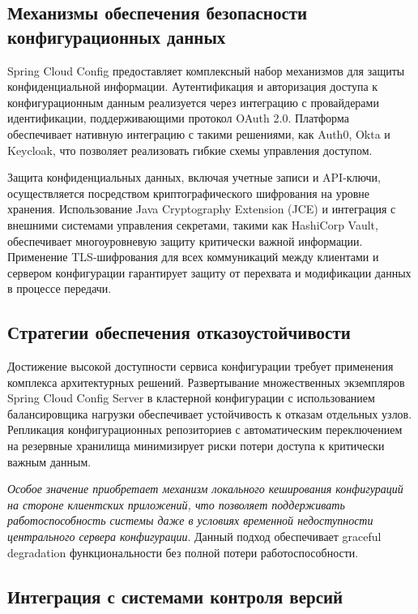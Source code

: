 \subsection{Механизмы обеспечения безопасности конфигурационных данных}

Spring Cloud Config предоставляет комплексный набор механизмов для защиты конфиденциальной информации. Аутентификация и авторизация доступа к конфигурационным данным реализуется через интеграцию с провайдерами идентификации, поддерживающими протокол OAuth 2.0. Платформа обеспечивает нативную интеграцию с такими решениями, как Auth0, Okta и Keycloak, что позволяет реализовать гибкие схемы управления доступом.

Защита конфиденциальных данных, включая учетные записи и API-ключи, осуществляется посредством криптографического шифрования на уровне хранения. Использование Java Cryptography Extension (JCE) и интеграция с внешними системами управления секретами, такими как HashiCorp Vault, обеспечивает многоуровневую защиту критически важной информации. Применение TLS-шифрования для всех коммуникаций между клиентами и сервером конфигурации гарантирует защиту от перехвата и модификации данных в процессе передачи.

\subsection{Стратегии обеспечения отказоустойчивости}

Достижение высокой доступности сервиса конфигурации требует применения комплекса архитектурных решений. Развертывание множественных экземпляров Spring Cloud Config Server в кластерной конфигурации с использованием балансировщика нагрузки обеспечивает устойчивость к отказам отдельных узлов. Репликация конфигурационных репозиториев с автоматическим переключением на резервные хранилища минимизирует риски потери доступа к критически важным данным.

\textit{Особое значение приобретает механизм локального кеширования конфигураций на стороне клиентских приложений, что позволяет поддерживать работоспособность системы даже в условиях временной недоступности центрального сервера конфигурации}. Данный подход обеспечивает graceful degradation функциональности без полной потери работоспособности.

\subsection{Интеграция с системами контроля версий}

